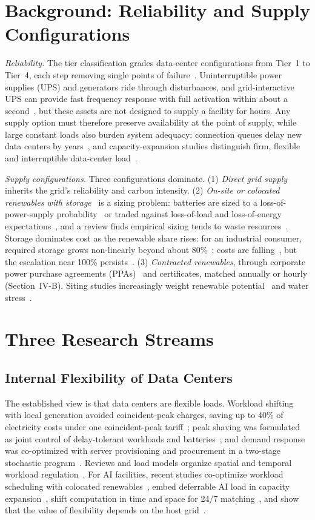 \documentclass[conference]{IEEEtran}
\begin{document}
\section{Background: Reliability and Supply Configurations}
\emph{Reliability.} The tier classification grades data-center configurations from Tier~1 to Tier~4, each step removing single points of failure~\cite{r41}. Uninterruptible power supplies (UPS) and generators ride through disturbances, and grid-interactive UPS can provide fast frequency response with full activation within about a second~\cite{r7}, but these assets are not designed to supply a facility for hours. Any supply option must therefore preserve availability at the point of supply, while large constant loads also burden system adequacy: connection queues delay new data centers by years~\cite{r28}, and capacity-expansion studies distinguish firm, flexible and interruptible data-center load~\cite{r27}.

\emph{Supply configurations.} Three configurations dominate. (1) \emph{Direct grid supply} inherits the grid's reliability and carbon intensity. (2) \emph{On-site or colocated renewables with storage}~\cite{r8,r22} is a sizing problem: batteries are sized to a loss-of-power-supply probability~\cite{r31} or traded against loss-of-load and loss-of-energy expectations~\cite{r32}, and a review finds empirical sizing tends to waste resources~\cite{r30}. Storage dominates cost as the renewable share rises: for an industrial consumer, required storage grows non-linearly beyond about 80\%~\cite{r15}; costs are falling~\cite{r43}, but the escalation near 100\% persists~\cite{r11,r15}. (3) \emph{Contracted renewables}, through corporate power purchase agreements (PPAs)~\cite{r42} and certificates, matched annually or hourly (Section~IV-B). Siting studies increasingly weight renewable potential~\cite{r34} and water stress~\cite{r35}.

\section{Three Research Streams}
\subsection{Internal Flexibility of Data Centers}
The established view is that data centers are flexible loads. Workload shifting with local generation avoided coincident-peak charges, saving up to 40\% of electricity costs under one coincident-peak tariff~\cite{r2}; peak shaving was formulated as joint control of delay-tolerant workloads and batteries~\cite{r6}; and demand response was co-optimized with server provisioning and procurement in a two-stage stochastic program~\cite{r5}. Reviews and load models organize spatial and temporal workload regulation~\cite{r3,r4}. For AI facilities, recent studies co-optimize workload scheduling with colocated renewables~\cite{r8}, embed deferrable AI load in capacity expansion~\cite{r24}, shift computation in time and space for 24/7 matching~\cite{r9}, and show that the value of flexibility depends on the host grid~\cite{r27}.
\end{document}
